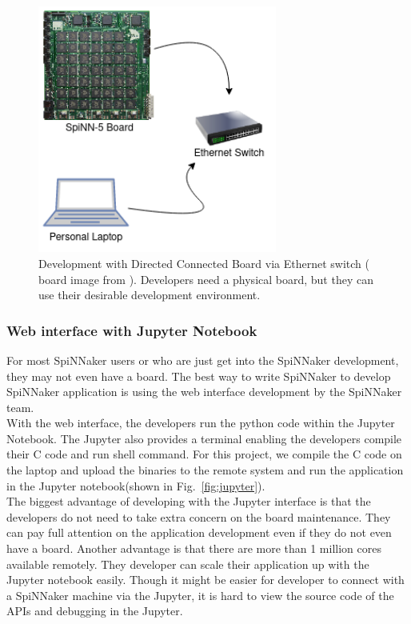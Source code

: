 \begin{figure}[tb]
   \centering
       \includegraphics[width=0.7\textwidth]{figures/laptop.png}
       \caption{Development with Directed Connected Board via Ethernet switch ( board image from \cite{spinn-core}). Developers need a physical board, but they can use their desirable development environment.}
       \label{fig:laptop}
\end{figure}


\subsubsection{Web interface with Jupyter Notebook}
For most SpiNNaker users or who are just get into the SpiNNaker development, they may not even have a board. The best way to write SpiNNaker to develop SpiNNaker application is using the web interface development by the SpiNNaker team. \\

With the web interface, the developers run the python code within the Jupyter Notebook. The Jupyter also provides a terminal enabling the developers compile their C code and run shell command. For this project, we compile the C code on the laptop and upload the binaries to the remote system and run the application in the Jupyter notebook(shown in Fig.~\ref{fig:jupyter}).\\

The biggest advantage of developing with the Jupyter interface is that the developers do not need to take extra concern on the board maintenance. They can pay full attention on the application development even if they do not even have a board. Another advantage is that there are more than 1 million cores available remotely. They developer can scale their application up with the Jupyter notebook easily. Though it might be easier for developer to connect with a SpiNNaker machine via the Jupyter, it is hard to view the source code of the APIs and debugging in the Jupyter. \\

